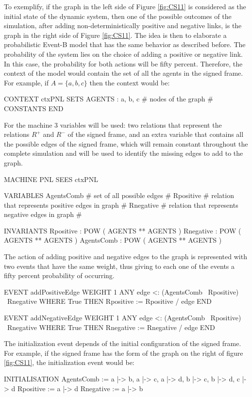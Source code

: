 To exemplify, if the graph in the left side of Figure \ref{fig:CS11} is considered as the initial state of the dynamic system, then one of the possible outcomes of the simulation, after adding non-deterministically positive and negative links, is the graph in the right side of Figure \ref{fig:CS11}. The idea is then to elaborate a probabilistic Event-B model that has the same behavior as described before. The probability of the system lies on the choice of adding a positive or negative link. In this case, the probability for both actions will be fifty percent. Therefore, the context of the model would contain the set of all the agents in the signed frame. For example, if $A = \{a,b,c\}$ then the context would be:
\begin{maude2}

CONTEXT ctxPNL
SETS 
    AGENTS : { a, b, c } # nodes of the graph #
CONSTANTS 
END
\end{maude2}

For the machine 3 variables will be used: two relations that represent the relations $R^+$ and $R^-$ of the signed frame, and an extra variable that contains all the possible edges of the signed frame, which will remain constant throughout the complete simulation and will be used to identify the missing edges to add to the graph.

\begin{maude2}

MACHINE PNL
  SEES ctxPNL

  VARIABLES
    AgentsComb # set of all possible edges #
    Rpositive # relation that represents positive edges in graph #
    Rnegative # relation that represents negative edges in graph # 

  INVARIANTS
    Rpositive :  POW ( AGENTS ** AGENTS )
    Rnegative :  POW ( AGENTS ** AGENTS )
    AgentsComb :  POW ( AGENTS ** AGENTS )
\end{maude2}
The action of adding positive and negative edges to the graph is represented with two events that have the same weight, thus giving to each one of the events a fifty percent probability of occurring. 
\begin{maude2}

  EVENT addPositiveEdge 
  WEIGHT 1
  ANY 
    edge <: (AgentsComb \ Rpositive) \ Rnegative
  WHERE
    True 
  THEN
    Rpositive := Rpositive \s/ edge
  END

  EVENT addNegativeEdge 
  WEIGHT 1
  ANY 
    edge <: (AgentsComb \ Rpositive) \ Rnegative
  WHERE
    True 
  THEN
    Rnegative := Rnegative \s/ edge
  END
\end{maude2}
The initialization event depends of the initial configuration of the signed frame. For example, if the signed frame has the form of the graph on the right of figure \ref{fig:CS11}, the initialization event would be:
\begin{maude2}
    
INITIALISATION
    AgentsComb := { a |-> b, a |-> c, a |-> d, 
                    b |-> c, b |-> d,
                    c |-> d }
    Rpositive := {a |-> d} 
    Rnegative := {a |-> b}
\end{maude2}

